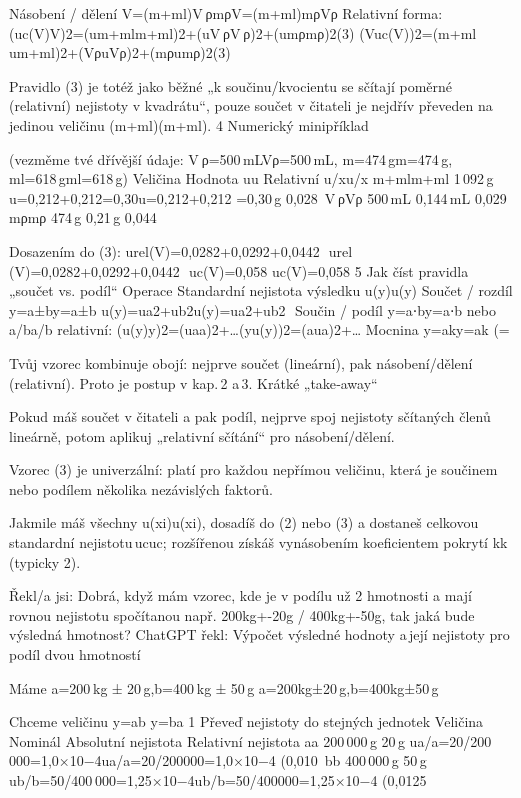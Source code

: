 {    Násobení / dělení V=(m+ml)V ⁣ρmρV=(m+ml​)mρ​Vρ​​
    Relativní forma:
    (uc(V)V)2=(um+mlm+ml)2+(uV ⁣ρV ⁣ρ)2+(umρmρ)2(3)
    (Vuc​(V)​)2=(m+ml​um+ml​​​)2+(Vρ​uVρ​​​)2+(mρ​umρ​​​)2(3)

Pravidlo (3) je totéž jako běžné „k součinu/kvocientu se sčítají poměrné (relativní) nejistoty v kvadrátu“, pouze součet v čitateli je nejdřív převeden na jedinou veličinu (m+ml)(m+ml​).
4  Numerický minipříklad

(vezměme tvé dřívější údaje: V ⁣ρ=500 mLVρ​=500 mL, m=474 gm=474 g, ml=618 gml​=618 g)
Veličina	Hodnota	uu	Relativní u/xu/x
m+mlm+ml​	1 092 g	u=0,212+0,212=0,30u=0,212+0,212
​=0,30 g	0,028 %
V ⁣ρVρ​	500 mL	0,144 mL	0,029 %
mρmρ​	474 g	0,21 g	0,044 %

Dosazením do (3):
urel(V)=0,0282+0,0292+0,0442  %
urel​(V)=0,0282+0,0292+0,0442
​%
uc(V)=0,058%
uc​(V)=0,058%
5  Jak číst pravidla „součet vs. podíl“
Operace	Standardní nejistota výsledku u(y)u(y)
Součet / rozdíl y=a±by=a±b	u(y)=ua2+ub2u(y)=ua2​+ub2​
​
Součin / podíl y=a⋅by=a⋅b nebo a/ba/b	relativní: (u(y)y)2=(uaa)2+…(yu(y)​)2=(aua​​)2+…
Mocnina y=aky=ak	(\displaystyle {}=

Tvůj vzorec kombinuje obojí: nejprve součet (lineární), pak násobení/dělení (relativní). Proto je postup v kap. 2 a 3.
Krátké „take‑away“

    Pokud máš součet v čitateli a pak podíl, nejprve spoj nejistoty sčítaných členů lineárně, potom aplikuj „relativní sčítání“ pro násobení/dělení.

    Vzorec (3) je univerzální: platí pro každou nepřímou veličinu, která je součinem nebo podílem několika nezávislých faktorů.

    Jakmile máš všechny u(xi)u(xi​), dosadíš do (2) nebo (3) a dostaneš celkovou standardní nejistotu ucuc​; rozšířenou získáš vynásobením koeficientem pokrytí kk (typicky 2).

Řekl/a jsi:
Dobrá, když mám vzorec, kde je v podílu už 2 hmotnosti a mají rovnou nejistotu spočítanou např. 200kg+-20g / 400kg+-50g, tak jaká bude výsledná hmotnost?
ChatGPT řekl:
Výpočet výsledné hodnoty a její nejistoty pro podíl dvou hmotností

Máme
a=200 kg  ±  20 g,b=400 kg  ±  50 g
a=200kg±20 g,b=400kg±50 g

Chceme veličinu
y=ab
y=ba​
1  Převeď nejistoty do stejných jednotek
Veličina	Nominál	Absolutní nejistota	Relativní nejistota
aa	200 000 g	20 g	ua/a=20/200 000=1,0×10−4ua​/a=20/200000=1,0×10−4 (0,010 %
bb	400 000 g	50 g	ub/b=50/400 000=1,25×10−4ub​/b=50/400000=1,25×10−4 (0,0125 %

}
